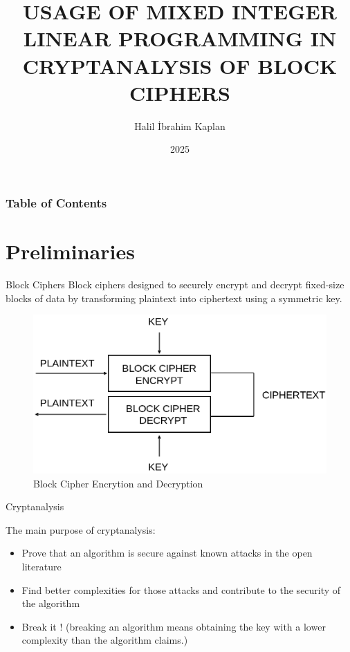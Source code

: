 \documentclass{beamer}
\title[MILP IN
CRYPTANALYSIS ] %
{USAGE OF MIXED INTEGER
LINEAR PROGRAMMING IN
CRYPTANALYSIS OF BLOCK
CIPHERS}
\author[Halil İbrahim Kaplan] %
{Halil İbrahim Kaplan }
\institute[] %
{
  Istanbul Technical University\\
  Informatics Institute
}
\date[2025] %
{2025}
\begin{document}
\frame{\titlepage}


\begin{frame}
\frametitle{Table of Contents}
\tableofcontents
\end{frame}
\section{Preliminaries}

\begin{frame}{Block Ciphers}
    Block ciphers designed to securely
encrypt and decrypt fixed-size blocks of data by transforming plaintext into ciphertext
using a symmetric key. 

\begin{figure}
    \centering
    \includegraphics[width=0.5\linewidth]{fig/Screenshot from 2025-08-28 11-23-09.png}
    \caption{Block Cipher Encrytion and Decryption}
    \label{fig:placeholder}
\end{figure}


\end{frame}


\begin{frame}{Cryptanalysis}

    The main
purpose of cryptanalysis:
 \begin{itemize}
    \item Prove that an algorithm is secure against known attacks
in the open literature

    \item Find better complexities for those attacks and contribute to the
security of the algorithm

    \item Break it ! (breaking an algorithm means obtaining the
key with a lower complexity than the algorithm claims.)
    
 \end{itemize}

\end{frame}
\end{document}
